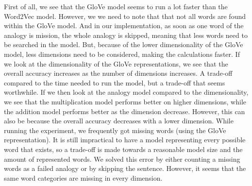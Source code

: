 First of all, we see that the GloVe model seems to run a lot faster than the Word2Vec model. However, we we need to note that that not all words are found within the GloVe model. And in our implementation, as soon as one word of the analogy is mission, the whole analogy is skipped, meaning that less words need to be searched in the model. But, because of the lower dimensionality of the GloVe model, less dimensions need to be considered, making the calculations faster.
\newline
If we look at the dimensionality of the GloVe representations, we see that the overall accuracy increases as the number of dimensions increases. A trade-off compared to the time needed to run the model, but a trade-off that seems worthwhile. 
If we then look at the analogy model compared to the dimensionality, we see that the multiplication model performs better on higher dimensions, while the addition model performs better as the dimension decrease. However, this can also be because the overall accuracy decreases with a lower dimension.
\newline
While running the experiment, we frequently got missing words (using the GloVe representation). It is still impractical to have a model representing every possible word that exists, so a trade-off is made towards a reasonable model size and the amount of represented words. We solved this error by either counting a missing words as a failed analogy or by skipping the sentence. However, it seems that the same word categories are missing in every dimension.

